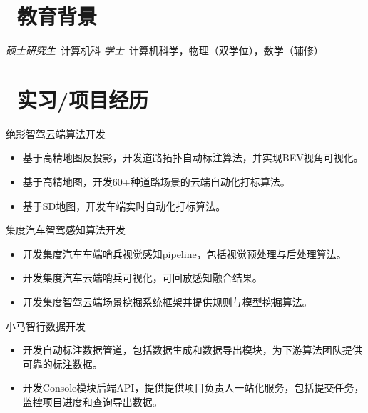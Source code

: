 \documentclass{resume}
\begin{document}


 
\section{\faGraduationCap\  教育背景}
\textit{硕士研究生}\ 计算机科
\textit{学士}\ 计算机科学，物理（双学位），数学（辅修）

\section{\faUsers\ 实习/项目经历}
\role{专家算法工程师}{工作经历}
绝影智驾云端算法开发
\begin{itemize}
  \item 基于高精地图反投影，开发道路拓扑自动标注算法，并实现BEV视角可视化。
  \item 基于高精地图，开发60+种道路场景的云端自动化打标算法。
  \item 基于SD地图，开发车端实时自动化打标算法。
\end{itemize}

集度汽车智驾感知算法开发
\begin{itemize}
  \item 开发集度汽车车端哨兵视觉感知pipeline，包括视觉预处理与后处理算法。
  \item 开发集度汽车云端哨兵可视化，可回放感知融合结果。
  \item 开发集度智驾云端场景挖掘系统框架并提供规则与模型挖掘算法。
\end{itemize}

小马智行数据开发
\begin{itemize}
  \item 开发自动标注数据管道，包括数据生成和数据导出模块，为下游算法团队提供可靠的标注数据。
  \item 开发Console模块后端API，提供提供项目负责人一站化服务，包括提交任务，监控项目进度和查询导出数据。
\end{itemize}
\end{document}
